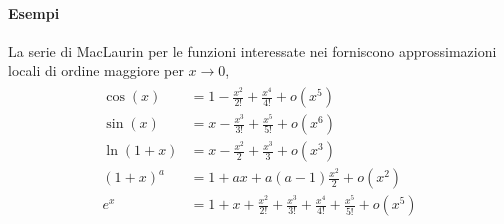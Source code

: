 \documentclass[letterpaper,10pt,english]{jupyterBook}
\begin{document}
\paragraph{Esempi}
\label{\detokenize{ch/infinitesimal_calculus/derivatives:esempi}}
\sphinxAtStartPar
La serie di MacLaurin per le funzioni interessate nei {\hyperref[\detokenize{ch/infinitesimal_calculus/analysis:infinitesimal-calculus-limits-fund}]{}} forniscono approssimazioni locali di ordine maggiore per \(x \rightarrow 0\),
\begin{equation*}
\begin{split}\begin{aligned}
 \cos(x) & = 1 - \frac{x^2}{2!} + \frac{x^4}{4!} + o(x^5) \\
 \sin(x) & = x - \frac{x^3}{3!} + \frac{x^5}{5!} + o(x^6) \\
 \ln (1+x) & = x - \frac{x^2}{2} + \frac{x^3}{3} + o(x^3) \\
 (1+x)^a & = 1 + a x + a(a-1) \frac{x^2}{2} + o(x^2) \\
 e^x     & = 1 + x + \frac{x^2}{2!} + \frac{x^3}{3!} + \frac{x^4}{4!} + \frac{x^5}{5!} + o(x^5)
\end{aligned}\end{split}
\end{equation*}
\sphinxAtStartPar
{} 
\end{document}
